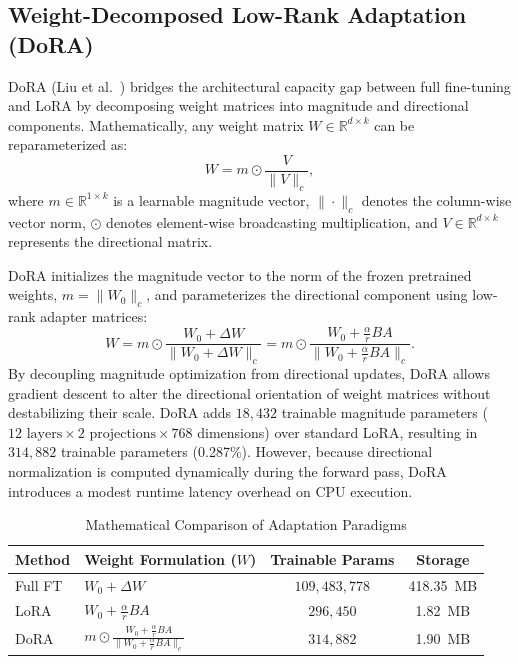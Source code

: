 \documentclass[conference]{IEEEtran}
\begin{document}
\subsection{Weight-Decomposed Low-Rank Adaptation (DoRA)}
DoRA (Liu et al.~\cite{liu2024dora}) bridges the architectural capacity gap between full fine-tuning and LoRA by decomposing weight matrices into magnitude and directional components. Mathematically, any weight matrix $W \in \mathbb{R}^{d \times k}$ can be reparameterized as:
\begin{equation}
    W = m \odot \frac{V}{\|V\|_c},
    \label{eq:dora_decomp}
\end{equation}
where $m \in \mathbb{R}^{1 \times k}$ is a learnable magnitude vector, $\|\cdot\|_c$ denotes the column-wise vector norm, $\odot$ denotes element-wise broadcasting multiplication, and $V \in \mathbb{R}^{d \times k}$ represents the directional matrix.

DoRA initializes the magnitude vector to the norm of the frozen pretrained weights, $m = \|W_0\|_c$, and parameterizes the directional component using low-rank adapter matrices:
\begin{equation}
    W = m \odot \frac{W_0 + \Delta W}{\|W_0 + \Delta W\|_c} = m \odot \frac{W_0 + \frac{\alpha}{r}BA}{\|W_0 + \frac{\alpha}{r}BA\|_c}.
    \label{eq:dora}
\end{equation}
By decoupling magnitude optimization from directional updates, DoRA allows gradient descent to alter the directional orientation of weight matrices without destabilizing their scale. DoRA adds $18,432$ trainable magnitude parameters ($12 \text{ layers} \times 2 \text{ projections} \times 768$ dimensions) over standard LoRA, resulting in $314,882$ trainable parameters (0.287\%). However, because directional normalization is computed dynamically during the forward pass, DoRA introduces a modest runtime latency overhead on CPU execution.

\begin{table}[t]
\caption{Mathematical Comparison of Adaptation Paradigms}
\label{tab:paradigm_comparison}
\centering
\begin{tabularx}{\columnwidth}{lXcc}
\toprule
\textbf{Method} & \textbf{Weight Formulation ($W$)} & \textbf{Trainable Params} & \textbf{Storage} \\
\midrule
Full FT & $W_0 + \Delta W$ & $109,483,778$ & 418.35~MB \\
LoRA & $W_0 + \frac{\alpha}{r}BA$ & $296,450$ & 1.82~MB \\
DoRA & $m \odot \frac{W_0 + \frac{\alpha}{r}BA}{\|W_0 + \frac{\alpha}{r}BA\|_c}$ & $314,882$ & 1.90~MB \\
\bottomrule
\end{tabularx}
\end{table}
\end{document}
